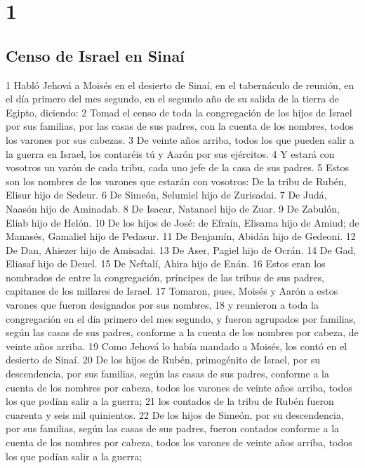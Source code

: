 
\chapter{1}


\section*{Censo de Israel en Sinaí}

1 Habló Jehová a Moisés en el desierto de Sinaí, en el tabernáculo de reunión, en el día primero del mes segundo, en el segundo año de su salida de la tierra de Egipto, diciendo:
2 Tomad el censo de toda la congregación de los hijos de Israel por sus familias, por las casas de sus padres, con la cuenta de los nombres, todos los varones por sus cabezas.
3 De veinte años arriba, todos los que pueden salir a la guerra en Israel, los contaréis tú y Aarón por sus ejércitos.
4 Y estará con vosotros un varón de cada tribu, cada uno jefe de la casa de sus padres.
5 Estos son los nombres de los varones que estarán con vosotros: De la tribu de Rubén, Elisur hijo de Sedeur.
6 De Simeón, Selumiel hijo de Zurisadai.
7 De Judá, Naasón hijo de Aminadab.
8 De Isacar, Natanael hijo de Zuar.
9 De Zabulón, Eliab hijo de Helón.
10 De los hijos de José: de Efraín, Elisama hijo de Amiud; de Manasés, Gamaliel hijo de Pedasur.
11 De Benjamín, Abidán hijo de Gedeoni.
12 De Dan, Ahiezer hijo de Amisadai.
13 De Aser, Pagiel hijo de Ocrán.
14 De Gad, Eliasaf hijo de Deuel. 
15 De Neftalí, Ahira hijo de Enán.
16 Estos eran los nombrados de entre la congregación, príncipes de las tribus de sus padres, capitanes de los millares de Israel.
17 Tomaron, pues, Moisés y Aarón a estos varones que fueron designados por sus nombres,
18 y reunieron a toda la congregación en el día primero del mes segundo, y fueron agrupados por familias, según las casas de sus padres, conforme a la cuenta de los nombres por cabeza, de veinte años arriba.
19 Como Jehová lo había mandado a Moisés, los contó en el desierto de Sinaí.
20 De los hijos de Rubén, primogénito de Israel, por su descendencia, por sus familias, según las casas de sus padres, conforme a la cuenta de los nombres por cabeza, todos los varones de veinte años arriba, todos los que podían salir a la guerra;
21 los contados de la tribu de Rubén fueron cuarenta y seis mil quinientos.
22 De los hijos de Simeón, por su descendencia, por sus familias, según las casas de sus padres, fueron contados conforme a la cuenta de los nombres por cabeza, todos los varones de veinte años arriba, todos los que podían salir a la guerra;
